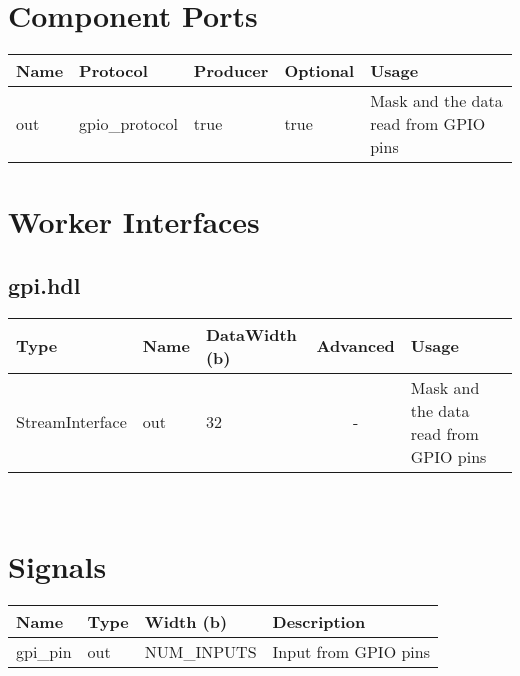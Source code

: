\documentclass{article}
\begin{document}
\begin{landscape}
\begin{flushleft}
\end{flushleft}

 
\section*{Component Ports}

        \begin{scriptsize}
                \begin{tabular}{|M{2.5cm}|M{2cm}|M{2cm}|M{3cm}|M{11cm}|}
                        \hline
                        Name & Protocol & Producer & Optional & Usage\\
                        \hline
                        out
                        & gpio\_protocol
                        & true
                        & true
                        & Mask and the data read from GPIO pins \\
                        \hline
                \end{tabular}
			\end{scriptsize}
			
\section*{Worker Interfaces}
\subsection*{gpi.hdl}
\begin{scriptsize}
\begin{tabular}{|M{5cm}|M{4cm}|M{4cm}|c|M{6.5cm}|M{6cm}|}
            \hline
            Type    & Name & DataWidth (b) & Advanced  & Usage     \\
            \hline
            StreamInterface & out   & 32  & - & Mask and the data read from GPIO pins \\
           \hline

\end{tabular}
\end{scriptsize} \\

	
\section*{Signals}
	\begin{scriptsize}
		\begin{tabular}{|M{2.5cm}|M{3cm}|M{6.5cm}|M{9.2cm}|}
			\hline
			Name         & Type   & Width (b) & Description                       \\
			\hline
			gpi\_pin    & out & NUM\_INPUTS & Input from GPIO pins            \\
			\hline
		\end{tabular}
	\end{scriptsize}
\end{landscape}
\end{document}
